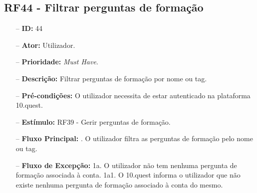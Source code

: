 \subsection{RF44 - Filtrar perguntas de formação}
\begin{itemize}
	\item[--] \textbf{ID:} 44
	\item[--]  \textbf{Ator:} Utilizador.
	\item[--]  \textbf{Prioridade:} \textit{Must Have}.
	\item[--]  \textbf{Descrição:} Filtrar perguntas de formação por nome ou tag.
	\item[--]  \textbf{Pré-condições:} O utilizador necessita de estar autenticado na plataforma 10.quest.
	\item[--]  \textbf{Estímulo:} RF39 - Gerir perguntas de formação.
	\item[--]  \textbf{Fluxo Principal:} 
	. O utilizador filtra as perguntas de formação pelo nome ou tag.
	\item[--]  \textbf{Fluxo de Excepção:} 
	\subitem 1a. O utilizador não tem nenhuma pergunta de formação associada à conta.
	\subitem 1a1. O 10.quest informa o utilizador que não existe nenhuma pergunta de formação associado à conta do mesmo.
\end{itemize}
\newpage

